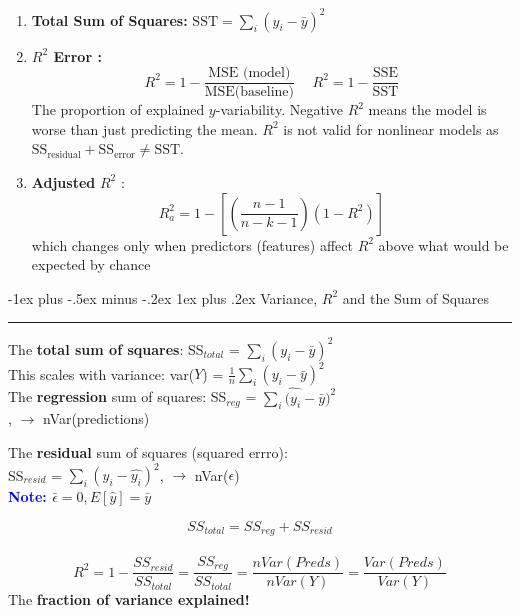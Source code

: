 \documentclass[letterpaper, 10.5pt,landscape]{article}
\makeatletter
\renewcommand{\subsubsection}{\@startsection{subsubsection}{3}{0mm}%
                                {-1ex plus -.5ex minus -.2ex}%
                                {1ex plus .2ex}%
                                {\normalfont\small\bfseries}}
\makeatother
\begin{document}
\begin{multicols*}{3}
\begin{enumerate}
    \item \textbf{Total Sum of Squares:} \(\boxed{\text{SST} = \sum_{i} (y_{i} - \bar{y})^{2}}\)
    
    \item \textbf{$R^{2}$ Error : }  
    \vspace{-3pt}
    \[\boxed{R^{2} = 1 - \frac{\text{MSE (model)}}{\text{MSE(baseline)}}} \hspace{15pt} \boxed{R^{2} = 1 - \frac{\text{SSE}}{\text{SST}}} \]   
    The proportion of explained $y$-variability. Negative $R^{2}$ means the model is worse than just predicting the mean. $R^{2}$ is not valid for nonlinear models as \(\boxed{\text{SS}_{\text{residual}} + \text{SS}_{\text{error}} \neq \text{SST}}\).  
    
    
    \item \textbf{Adjusted} $R^{2}$ :
    \vspace{-3pt}
    \[\boxed{R^{2}_{a} =  1 - \left[ \left( \frac{n-1}{n-k-1} \right) (1-R^{2})   \right]} \] 
    which changes only when predictors (features) affect $R^{2}$ above what would be expected by chance
\end{enumerate}

\subsubsection{Variance, \texorpdfstring{\(R^{2}\)}, and the Sum of Squares}  {\color{teal}\hrule height 0.5pt} \smallskip

The \textbf{total sum of squares}: SS$_{total}$ = \(\sum_{i} (y_{i} - \bar{y})^{2} \) \\

This scales with variance: var($Y$) = \( \frac{1}{n} \sum_{i} (y_{i} - \bar{y})^{2} \) \\

The \textbf{regression} sum of squares: SS$_{reg}$ = \(\sum_{i} \hat{(y_{i}} - \bar{y})^{2} \) \\ , $\rightarrow$ nVar(predictions)

The \textbf{residual} sum of squares (squared errro): \\ 
SS$_{resid}$ = \(\sum_{i} (y_{i} - \hat{y_{i}})^{2} \), $\rightarrow$ nVar($\epsilon$) \\

\textbf{\textcolor{blue}{Note: }} \(\bar{\epsilon} = 0, E[\hat{y}] = \bar{y} \)

\[SS_{total} = SS_{reg} + SS_{resid} \] \\
\[R^{2} = 1 - \frac{SS_{resid}}{SS_{total}} = \frac{SS_{reg}}{SS_{total}} = \frac{nVar(Preds)}{nVar(Y)} = \frac{Var(Preds)}{Var(Y)}\]
The \textbf{fraction of variance explained!} \\




\end{multicols*}
\end{document}
